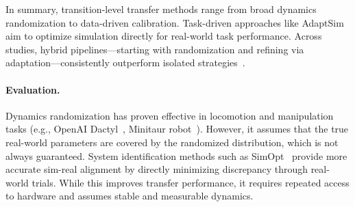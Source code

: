 In summary, transition-level transfer methods range from broad dynamics randomization to data-driven calibration. Task-driven approaches like AdaptSim aim to optimize simulation directly for real-world task performance. Across studies, hybrid pipelines—starting with randomization and refining via adaptation—consistently outperform isolated strategies~\cite{Chebotar2019,Ren2023}.

\begin{table}[t]
\centering
\caption{Comparison of Transition-Level Transfer Methods}
\label{tab:transition_methods}
\end{table}

\paragraph{Evaluation.} Dynamics randomization has proven effective in locomotion and manipulation tasks (e.g., OpenAI Dactyl~\cite{Akkaya2019}, Minitaur robot~\cite{Tan2018}). However, it assumes that the true real-world parameters are covered by the randomized distribution, which is not always guaranteed. System identification methods such as SimOpt~\cite{Chebotar2019} provide more accurate sim-real alignment by directly minimizing discrepancy through real-world trials. While this improves transfer performance, it requires repeated access to hardware and assumes stable and measurable dynamics.
